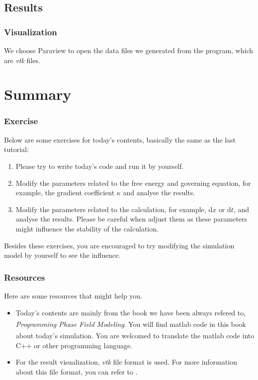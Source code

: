 \documentclass[compress,xcolor={dvipsnames}]{beamer}
\newcommand{\bhref}[2]{
    \href{#1}{\color{blue}{#2}}
}
\begin{document}
\subsection{Results}
\begin{frame}
    \frametitle{Visualization}

    We choose Paraview to open the data files we generated from the program, which are \emph{vtk} files.

\end{frame}

\section{Summary}
\begin{frame}
    \frametitle{Exercise}

    Below are some exercises for today's contents, basically the same as the last tutorial:

    \begin{enumerate}
        \item Please try to write today's code and run it by yourself.
        \item Modify the parameters related to the free energy and governing equation, for example, the gradient coefficient \(\kappa\) and analyse the results.
        \item Modify the parameters related to the calculation, for example, \(\mathrm{d}x\) or \(\mathrm{d}t\), and analyse the results. Please be careful when adjust them as these parameters might influence the stability of the calculation.
    \end{enumerate}

    Besides these exercises, you are encouraged to try modifying the simulation model by yourself to see the influence.

\end{frame}

\begin{frame}
    \frametitle{Resources}

    Here are some resources that might help you.
    \begin{itemize}
        \item Today's contents are mainly from the book we have been always refered to, \emph{Programming Phase Field Modeling}. You will find matlab\textsuperscript{\textregistered} code in this book about today's simulation. You are welcomed to translate the matlab\textsuperscript{\textregistered} code into C++ or other programming language.
        \item For the result visualization, \emph{vtk} file format is used. For more information about this file format, you can refer to \bhref{https://docs.vtk.org/en/latest/design_documents/VTKFileFormats.html}{VTK file format reference}.
    \end{itemize}
\end{frame}
\end{document}

